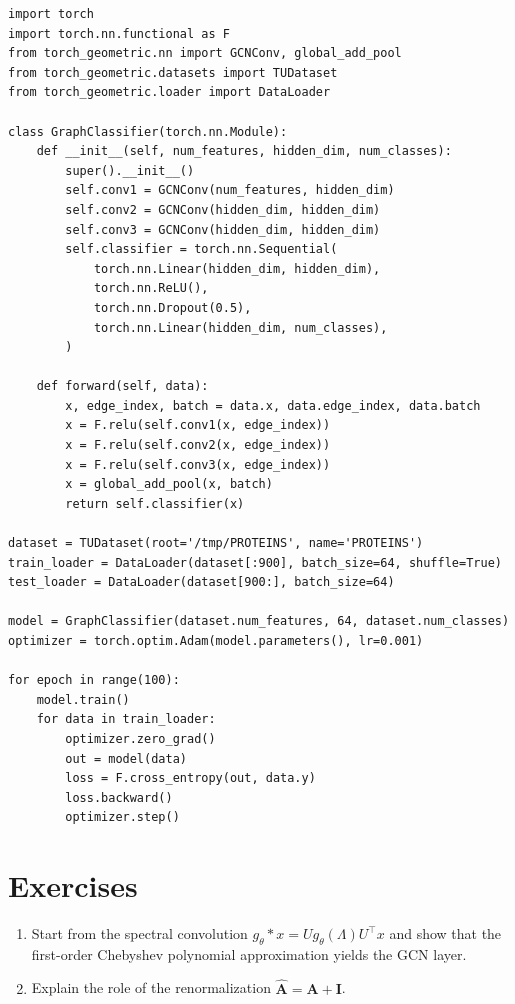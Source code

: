 \begin{codeblock}[title=\textbf{Molecular graph classification}]
\begin{verbatim}
import torch
import torch.nn.functional as F
from torch_geometric.nn import GCNConv, global_add_pool
from torch_geometric.datasets import TUDataset
from torch_geometric.loader import DataLoader

class GraphClassifier(torch.nn.Module):
    def __init__(self, num_features, hidden_dim, num_classes):
        super().__init__()
        self.conv1 = GCNConv(num_features, hidden_dim)
        self.conv2 = GCNConv(hidden_dim, hidden_dim)
        self.conv3 = GCNConv(hidden_dim, hidden_dim)
        self.classifier = torch.nn.Sequential(
            torch.nn.Linear(hidden_dim, hidden_dim),
            torch.nn.ReLU(),
            torch.nn.Dropout(0.5),
            torch.nn.Linear(hidden_dim, num_classes),
        )

    def forward(self, data):
        x, edge_index, batch = data.x, data.edge_index, data.batch
        x = F.relu(self.conv1(x, edge_index))
        x = F.relu(self.conv2(x, edge_index))
        x = F.relu(self.conv3(x, edge_index))
        x = global_add_pool(x, batch)
        return self.classifier(x)

dataset = TUDataset(root='/tmp/PROTEINS', name='PROTEINS')
train_loader = DataLoader(dataset[:900], batch_size=64, shuffle=True)
test_loader = DataLoader(dataset[900:], batch_size=64)

model = GraphClassifier(dataset.num_features, 64, dataset.num_classes)
optimizer = torch.optim.Adam(model.parameters(), lr=0.001)

for epoch in range(100):
    model.train()
    for data in train_loader:
        optimizer.zero_grad()
        out = model(data)
        loss = F.cross_entropy(out, data.y)
        loss.backward()
        optimizer.step()
\end{verbatim}
\end{codeblock}

\section*{Exercises}

\begin{exercise}
\begin{enumerate}
    \item Start from the spectral convolution $g_\theta * x = U g_\theta(\Lambda) U^\top x$
          and show that the first-order Chebyshev polynomial approximation yields
          the GCN layer.
    \item Explain the role of the renormalization $\hat{\mathbf{A}} = \mathbf{A} + \mathbf{I}$.
\end{enumerate}
\end{exercise}


